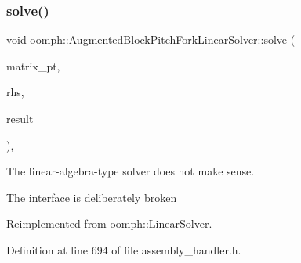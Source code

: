 \mbox{\label{classoomph_1_1AugmentedBlockPitchForkLinearSolver_a495eeac9b790841fb0b8b1d1c8222667}} 
\subsubsection{\texorpdfstring{solve()}{solve()}\hspace{0.1cm}{\footnotesize\ttfamily [2/3]}}
{\footnotesize\ttfamily void oomph\+::\+Augmented\+Block\+Pitch\+Fork\+Linear\+Solver\+::solve (\begin{DoxyParamCaption}\item[{\hyperlink{classoomph_1_1DoubleMatrixBase}{Double\+Matrix\+Base} $\ast$const \&}]{matrix\+\_\+pt,  }\item[{const \hyperlink{classoomph_1_1DoubleVector}{Double\+Vector} \&}]{rhs,  }\item[{\hyperlink{classoomph_1_1DoubleVector}{Double\+Vector} \&}]{result }\end{DoxyParamCaption})\hspace{0.3cm}{\ttfamily [inline]}, {\ttfamily [virtual]}}



The linear-\/algebra-\/type solver does not make sense. 

The interface is deliberately broken 

Reimplemented from \hyperlink{classoomph_1_1LinearSolver_a546c09822d18191df14caed864c04c09}{oomph\+::\+Linear\+Solver}.



Definition at line 694 of file assembly\+\_\+handler.\+h.

\mbox{\label{classoomph_1_1AugmentedBlockPitchForkLinearSolver_a8569368b8772d6642a50fb1279f4b61f}} 
